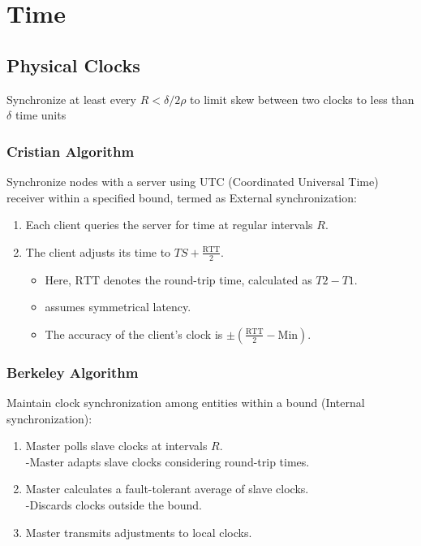 \section{Time}
\subsection{Physical Clocks}
Synchronize at least every $R < \delta/2\rho$ to limit skew between two clocks to less than $\delta$ time units
\subsubsection{Cristian Algorithm}
Synchronize nodes with a server using UTC (Coordinated Universal Time) receiver within a specified bound, termed as External synchronization:
\begin{enumerate}
    \item Each client queries the server for time at regular intervals \( R \).
    \item The client adjusts its time to \( TS + \frac{\text{RTT}}{2} \).
    \begin{itemize}
        \item Here, \( \text{RTT} \) denotes the round-trip time, calculated as \( T2 - T1 \).
        \item assumes symmetrical latency.
        \item The accuracy of the client's clock is \( \pm (\frac{\text{RTT}}{2} - \text{Min}) \).
    \end{itemize}
\end{enumerate}
    

\subsubsection{Berkeley Algorithm}
Maintain clock synchronization among entities within a bound (Internal synchronization):
    \begin{enumerate}
        \item Master polls slave clocks at intervals \( R \).\\
       -Master adapts slave clocks considering round-trip times.
        \item Master calculates a fault-tolerant average of slave clocks.\\
        -Discards clocks outside the bound.
        \item Master transmits adjustments to local clocks.
    \end{enumerate}


